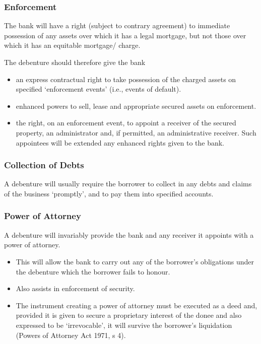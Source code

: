 \documentclass[
]{article}
\providecommand{\tightlist}{%
  \setlength{\itemsep}{0pt}\setlength{\parskip}{0pt}}
\begin{document}
\hypertarget{enforcement}{%
\subsubsection{Enforcement}\label{enforcement}}

The bank will have a right (subject to contrary agreement) to immediate
possession of any assets over which it has a legal mortgage, but not
those over which it has an equitable mortgage/ charge.

The debenture should therefore give the bank

\begin{itemize}
\tightlist
\item
  an express contractual right to take possession of the charged assets
  on specified `enforcement events' (i.e., events of default).
\item
  enhanced powers to sell, lease and appropriate secured assets on
  enforcement.
\item
  the right, on an enforcement event, to appoint a receiver of the
  secured property, an administrator and, if permitted, an
  administrative receiver. Such appointees will be extended any enhanced
  rights given to the bank.
\end{itemize}

\hypertarget{collection-of-debts}{%
\subsubsection{Collection of Debts}\label{collection-of-debts}}

A debenture will usually require the borrower to collect in any debts
and claims of the business `promptly', and to pay them into specified
accounts.

\hypertarget{power-of-attorney}{%
\subsubsection{Power of Attorney}\label{power-of-attorney}}

A debenture will invariably provide the bank and any receiver it
appoints with a power of attorney.

\begin{itemize}
\tightlist
\item
  This will allow the bank to carry out any of the borrower's
  obligations under the debenture which the borrower fails to honour.
\item
  Also assists in enforcement of security.
\item
  The instrument creating a power of attorney must be executed as a deed
  and, provided it is given to secure a proprietary interest of the
  donee and also expressed to be `irrevocable', it will survive the
  borrower's liquidation (Powers of Attorney Act 1971, s 4).
\end{itemize}
\end{document}
